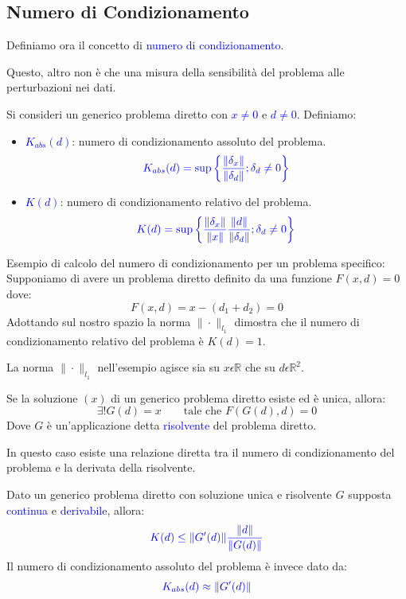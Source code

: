 \subsection{Numero di Condizionamento}

Definiamo ora il concetto di \textcolor{blue}{numero di condizionamento}.

Questo, altro non è che una misura della sensibilità del problema alle perturbazioni nei dati.

\begin{defi}
    Si consideri un generico problema diretto con \textcolor{blue}{$x\neq0$} 
    e \textcolor{blue}{$d\neq0$}. Definiamo:
    \begin{itemize}
        \item \textcolor{blue}{$K_{abs}(d)$}: numero di condizionamento assoluto del problema.\[\textcolor{blue}{K_{abs}(d) = \sup\left\{ \frac{\|\delta_x\|}{\|\delta_d\|}; \delta_d \neq 0\right\}} \]
        \item \textcolor{blue}{$K(d)$}: numero di condizionamento relativo del problema.\[\textcolor{blue}{K(d) = \sup\left\{\frac{\|\delta_x\|}{\|x\|}\frac{\|d\|}{\|\delta_d\|}; \delta_d \neq 0\right\}}\]
    \end{itemize}
\end{defi}

\begin{exercise}
Esempio di calcolo del numero di condizionamento per un problema specifico:
Supponiamo di avere un problema diretto definito da una funzione $F(x, d) = 0$ dove:
\[
 F(x, d) = x - (d_1+d_2) = 0
\]
Adottando sul nostro spazio la norma $\|\cdot\|_{l_1}$ dimostra che il numero di condizionamento relativo del problema è $K(d) = 1$.
\end{exercise}

\begin{obs}
    La norma $\|\cdot\|_{l_1}$ nell'esempio agisce sia su $x \epsilon \mathbb{R}$ che su $d \epsilon \mathbb{R}^2$.
\end{obs}

Se la soluzione $(x)$ di un generico problema diretto esiste ed è unica, allora: 
\[
\exists ! G(d) = x  \qquad \text{tale che} \,\, F(G(d), d) = 0
\]
Dove $G$ è un'applicazione detta \textcolor{blue}{risolvente} del problema diretto.

In questo caso esiste una relazione diretta tra il numero di condizionamento del problema e la derivata della risolvente.

\begin{theorem}
    Dato un generico problema diretto con soluzione unica e risolvente $G$ supposta \textcolor{blue}{continua}
    e \textcolor{blue}{derivabile}, allora:
    \[\textcolor{blue}{K(d) \leq \|G'(d)\| \frac{\|d\|}{\|G(d)\|}}\]
    Il numero di condizionamento assoluto del problema è invece dato da:
    \[\textcolor{blue}{K_{abs}(d) \approx \|G'(d)\|}\]
\end{theorem}

